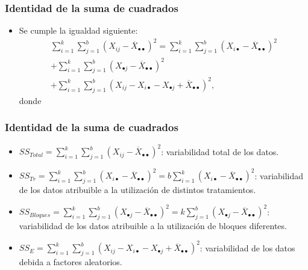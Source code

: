 \begin{frame}
\frametitle{Identidad de la suma de cuadrados}
{
\begin{itemize}
\item<2-> Se cumple la igualdad siguiente:
\[
\begin{array}{l}
\sum\limits_{i=1}^k\sum\limits_{j=1}^b (X_{ij}- \overline{X}_{\bullet\bullet})^2 =  \sum\limits_{i=1}^k\sum\limits_{j=1}^b (X_{i\bullet}-\overline{X}_{\bullet\bullet})^2 \\ + \sum\limits_{i=1}^k\sum\limits_{j=1}^b (X_{\bullet j}-\overline{X}_{\bullet\bullet})^2 \\ + \sum\limits_{i=1}^k\sum\limits_{j=1}^b (X_{ij} - X_{i\bullet}- X_{\bullet j}+\overline{X}_{\bullet\bullet})^2,
\end{array}
\]
donde
\end{itemize}}
\end{frame}
\begin{frame}
\frametitle{Identidad de la suma de cuadrados}
{
\begin{itemize}
\item<2-> $SS_{Total} = \sum\limits_{i=1}^k\sum\limits_{j=1}^b (X_{ij}- \overline{X}_{\bullet\bullet})^2$: variabilidad total de los datos.
\item<3-> $SS_{Tr}=\sum\limits_{i=1}^k\sum\limits_{j=1}^b (X_{i\bullet}-\overline{X}_{\bullet\bullet})^2= b \sum\limits_{i=1}^k (X_{i\bullet}-\overline{X}_{\bullet\bullet})^2$: variabilidad de los datos atribuible a la utilización de distintos tratamientos.
\item<4-> $SS_{Bloques}=\sum\limits_{i=1}^k\sum\limits_{j=1}^b (X_{\bullet j}-\overline{X}_{\bullet\bullet})^2=k \sum\limits_{j=1}^b (X_{\bullet j}-\overline{X}_{\bullet\bullet})^2 $: variabilidad de los datos atribuible a la utilización de bloques diferentes.
\item<5-> $SS_E= \sum\limits_{i=1}^k\sum\limits_{j=1}^b (X_{ij} - X_{i\bullet}- X_{\bullet j}+\overline{X}_{\bullet\bullet})^2$: variabilidad de los datos debida a factores aleatorios.
\end{itemize}}
\end{frame}

